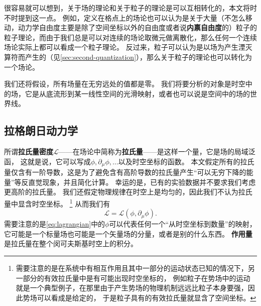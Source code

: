 \documentclass[UTF8, a4paper]{ctexart}
\begin{document}
很容易就可以想到，关于场的理论和关于粒子的理论是可以互相转化的，本文将时不时提到这一点。
例如，定义在格点上的场论也可以认为是关于大量（不怎么移动，动力学自由度主要是除了空间坐标以外的自由度或者说\textbf{内禀自由度}的）粒子的粒子理论，而由于我们总是可以对连续的场论取微元做离散化，那么任何一个连续场论实际上都可以看成一个粒子理论。
反过来，粒子可以认为是以场为产生湮灭算符而产生的（见\autoref{sec:second-quantization}），那么关于粒子的理论也可以转化为一个场论。

我们还将假设，所有场量在无穷远处的值都是零。
我们将要分析的对象是时空中的场，它是从底流形到某一线性空间的光滑映射，或者也可以说是空间中的场的世界线。

\subsection{拉格朗日动力学}

所谓\textbf{拉氏量密度}$\mathcal{L}$——在场论中简称为\textbf{拉氏量}——是这样一个量，它是场的局域泛函，
这就是说，它可以写成$\phi, \partial_\mu \phi, \ldots$以及时空坐标的函数。
本文假定所有的拉氏量仅含有一阶导数，这是为了避免含有高阶导数的拉氏量产生“可以无穷下降的能量”等反直觉现象，并且简化计算。
幸运的是，已有的实验数据并不要求我们考虑更高阶的拉氏量。
我们还假定物理规律在时空上是均匀的，因此我们不认为拉氏量中显含时空坐标。%
\footnote{
    需要注意的是在系统中有相互作用且其中一部分的运动状态已知的情况下，另一部分的有效拉氏量中是有可能出现时空坐标的，
    例如粒子在势场中的运动就是一个典型例子，在那里由于产生势场的物理机制远远比粒子本身要强，因此势场可以看成是给定的，
    于是粒子具有的有效拉氏量就显含了空间坐标。}%
从而我们有
\begin{equation}
    \mathcal{L} = \mathcal{L}(\phi, \partial_\mu \phi).
    \label{eq:lagrangian}
\end{equation}
需要注意的是\eqref{eq:lagrangian}中的$\phi$可以代表任何一个“从时空坐标到数量”的映射，
它可能是一个标量场也可能是一个矢量场的分量，或者是别的什么东西。
\textbf{作用量}是拉氏量在整个闵可夫斯基时空上的积分。
\end{document}
